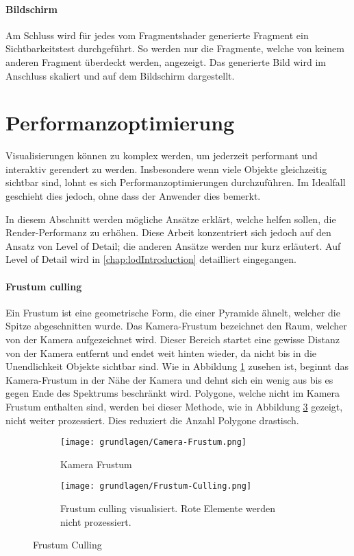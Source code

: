 \paragraph{Bildschirm}
Am Schluss wird für jedes vom Fragmentshader generierte Fragment ein Sichtbarkeitstest durchgeführt. So werden nur die Fragmente, welche von keinem anderen Fragment überdeckt werden, angezeigt. Das generierte Bild wird im Anschluss skaliert und auf dem Bildschirm dargestellt.


\section{Performanzoptimierung}
Visualisierungen können zu komplex werden, um jederzeit performant und interaktiv gerendert zu werden.
Insbesondere wenn viele Objekte gleichzeitig sichtbar sind, lohnt es sich Performanzoptimierungen durchzuführen.
Im Idealfall geschieht dies jedoch, ohne dass der Anwender dies bemerkt.

In diesem Abschnitt werden mögliche Ansätze erklärt, welche helfen sollen, die Render-Performanz zu erhöhen. Diese Arbeit konzentriert sich jedoch auf den Ansatz von Level of Detail; die anderen Ansätze werden nur kurz erläutert. Auf Level of Detail wird in \autoref{chap:lodIntroduction} detailliert eingegangen.

\paragraph{Frustum culling}
Ein Frustum ist eine geometrische Form, die einer Pyramide ähnelt, welcher die Spitze abgeschnitten wurde.
Das Kamera-Frustum bezeichnet den Raum, welcher von der Kamera aufgezeichnet wird. Dieser Bereich startet eine gewisse Distanz von der Kamera entfernt und endet weit hinten wieder, da nicht bis in die Unendlichkeit Objekte sichtbar sind.
Wie in Abbildung \ref{fig:CameraFrustum} zusehen ist, beginnt das Kamera-Frustum in der Nähe der Kamera und dehnt sich ein wenig aus bis es gegen Ende des Spektrums beschränkt wird.
Polygone, welche nicht im Kamera Frustum enthalten sind, werden bei dieser Methode, wie in Abbildung \ref{fig:FrustumCulling} gezeigt, nicht weiter prozessiert.
Dies reduziert die Anzahl Polygone drastisch.

\begin{figure}[H]
  \centering
  \begin{subfigure}{.5\textwidth}
    \centering
    \texttt{[image: grundlagen/Camera-Frustum.png]}
    \caption{Kamera Frustum}
    \label{fig:CameraFrustum}
  \end{subfigure}%
  \begin{subfigure}{.5\textwidth}
    \centering
    \texttt{[image: grundlagen/Frustum-Culling.png]}
    \caption{Frustum culling visualisiert. Rote Elemente werden nicht prozessiert.}
    \label{fig:FrustumCulling}
  \end{subfigure}
  \caption{Frustum Culling}
\end{figure}

